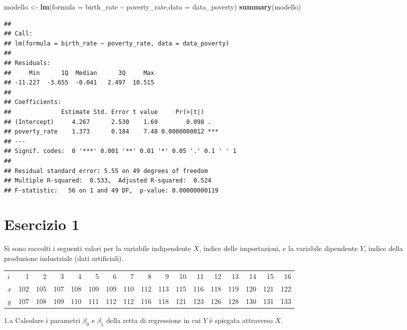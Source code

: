 \documentclass[
  11pt,
]{book}
\newenvironment{Shaded}{\begin{snugshade}}{\end{snugshade}}
\newcommand{\AttributeTok}[1]{\textcolor[rgb]{0.13,0.29,0.53}{#1}}
\newcommand{\FunctionTok}[1]{\textcolor[rgb]{0.13,0.29,0.53}{\textbf{#1}}}
\newcommand{\NormalTok}[1]{#1}
\newcommand{\OtherTok}[1]{\textcolor[rgb]{0.56,0.35,0.01}{#1}}
\newcommand{\SpecialCharTok}[1]{\textcolor[rgb]{0.81,0.36,0.00}{\textbf{#1}}}
\theoremstyle{mytheoremstyle}
\theoremstyle{mydefstyle}
\begin{document}
\begin{Shaded}
\begin{Highlighting}[]
\NormalTok{modello }\OtherTok{\textless{}{-}} \FunctionTok{lm}\NormalTok{(}\AttributeTok{formula =}\NormalTok{ birth\_rate }\SpecialCharTok{\textasciitilde{}}\NormalTok{ poverty\_rate,}\AttributeTok{data =}\NormalTok{ data\_poverty)}
\FunctionTok{summary}\NormalTok{(modello)}
\end{Highlighting}
\end{Shaded}

\begin{verbatim}
## 
## Call:
## lm(formula = birth_rate ~ poverty_rate, data = data_poverty)
## 
## Residuals:
##     Min      1Q  Median      3Q     Max 
## -11.227  -3.655  -0.041   2.497  10.515 
## 
## Coefficients:
##              Estimate Std. Error t value     Pr(>|t|)    
## (Intercept)     4.267      2.530    1.69        0.098 .  
## poverty_rate    1.373      0.184    7.48 0.0000000012 ***
## ---
## Signif. codes:  0 '***' 0.001 '**' 0.01 '*' 0.05 '.' 0.1 ' ' 1
## 
## Residual standard error: 5.55 on 49 degrees of freedom
## Multiple R-squared:  0.533,  Adjusted R-squared:  0.524 
## F-statistic:   56 on 1 and 49 DF,  p-value: 0.00000000119
\end{verbatim}

\section{Esercizio 1}\label{esercizio-1-3}

Si sono raccolti i seguenti valori per la variabile indipendente
\(X\), indice delle importazioni, e la variabile dipendente \(Y\),
indice della produzione industriale (dati artificiali).

\small
\begin{table}[H]
\centering
\begin{tabular}{lrrrrrrrrrrrrrrrr}
\toprule
$i$ & 1 & 2 & 3 & 4 & 5 & 6 & 7 & 8 & 9 & 10 & 11 & 12 & 13 & 14 & 15 & 16\\
$x$ & 102 & 105 & 107 & 108 & 109 & 109 & 110 & 112 & 113 & 115 & 116 & 118 & 119 & 120 & 121 & 122\\
$y$ & 107 & 108 & 109 & 110 & 111 & 112 & 112 & 116 & 118 & 121 & 123 & 126 & 128 & 130 & 131 & 133\\
\bottomrule
\end{tabular}
\end{table}
\normalsize

1.a Calcolare i parametri \(\beta_{0}\) e \(\beta_{1}\) della
retta di regressione in cui \(Y\) è spiegata attraverso \(X\).
\end{document}
